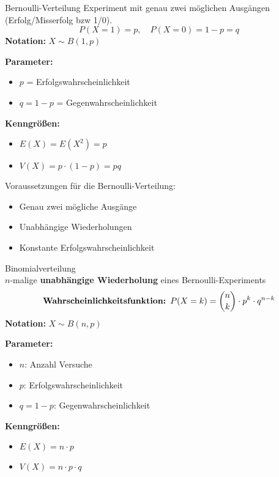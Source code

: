 \begin{definition}{Bernoulli-Verteilung}
Experiment mit genau zwei möglichen Ausgängen (Erfolg/Misserfolg bzw 1/0).
$$P(X=1) = p, \quad P(X=0) = 1-p = q$$
\textbf{Notation:} $X \sim B(1,p)$

\begin{minipage}[t]{0.5\textwidth}
\textbf{Parameter:}
\begin{itemize}
    \item $p$ = Erfolgswahrscheinlichkeit
    \item $q = 1-p$ = Gegenwahrscheinlichkeit
\end{itemize}
\end{minipage}
\begin{minipage}[t]{0.5\textwidth}
\textbf{Kenngrößen:}
\begin{itemize}
    \item $E(X)=E(X^2)=p$
    \item $V(X)=p \cdot(1-p)=pq$
\end{itemize}
\end{minipage}
\end{definition}

\begin{remark}
Voraussetzungen für die Bernoulli-Verteilung:
\begin{itemize}
    \item Genau zwei mögliche Ausgänge
    \item Unabhängige Wiederholungen
    \item Konstante Erfolgswahrscheinlichkeit
\end{itemize}
\end{remark}


\begin{definition}{Binomialverteilung}\\
$n$-malige \textbf{unabhängige Wiederholung} eines Bernoulli-Experiments
$$\text{\textbf{Wahrscheinlichkeitsfunktion: }}P(X=k) = \binom{n}{k} \cdot p^k \cdot q^{n-k}$$
\textbf{Notation:} $X \sim B(n,p)$

\begin{minipage}[t]{0.5\textwidth}
\textbf{Parameter:}
\begin{itemize}
    \item $n$: Anzahl Versuche
    \item $p$: Erfolgswahrscheinlichkeit
    \item $q = 1-p$: Gegenwahrscheinlichkeit
\end{itemize}
\end{minipage}
\begin{minipage}[t]{0.5\textwidth}
\textbf{Kenngrößen:}
\begin{itemize}
    \item $E(X) = n \cdot p$
    \item $V(X) = n \cdot p \cdot q$
\end{itemize}
\end{minipage}
\end{definition}

